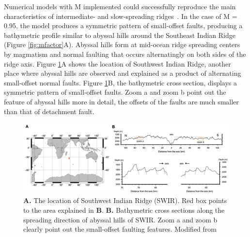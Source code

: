 \documentclass[letterpaper,12pt,notitle]{memphisthesis}                     %
\begin{document}
Numerical models with M implemented could successfully reproduce the main characteristics of intermediate- and slow-spreading ridges~\citep{Buck2005}. In the case of M = 0.95, the model produces a symmetric pattern of small-offset faults, producing a bathymetric profile similar to abyssal hills around the Southeast Indian Ridge (Figure \ref{fig:mfactor}A). Abyssal hills form at mid-ocean ridge spreading centers by magmatism and normal faulting that occurs alternatingly on both sides of the ridge axis. Figure \ref{fig:abyssalhill}A shows the location of Southwest Indian Ridge, another place where abyssal hills are observed and explained as a product of alternating small-offset normal faults. Figure \ref{fig:abyssalhill}B, the bathymetric cross section, displays a symmetric pattern of small-offset faults. Zoom a and zoom b point out the feature of abyssal hills more in detail, the offsets of the faults are much smaller than that of detachment fault.
%
\begin{figure}[!htb]
	\centering
	\includegraphics[width=0.98\linewidth]{./figs/abyssalhill.png}
	\caption{\textbf{A.} The location of Southwest Indian Ridge (SWIR). Red box points to the area explained in \textbf{B}. \textbf{B.} Bathymetric cross sections along the spreading direction of abyssal hills of SWIR. Zoom a and zoom b clearly point out the small-offset faulting features. Modified from \citet{Mendel2003}}
	\label{fig:abyssalhill}
\end{figure}
\end{document}
